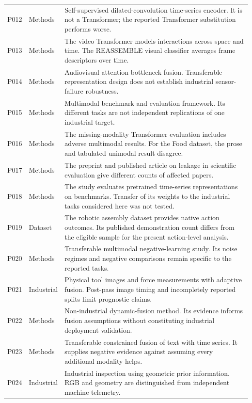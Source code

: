 \begin{longtable}{@{}P{.25\textwidth}P{.16\textwidth}P{.53\textwidth}@{}}
P012 \citep{P012} & Methods & Self-supervised dilated-convolution time-series encoder. It is not a Transformer; the reported Transformer substitution performs worse. \\
P013 \citep{P013} & Methods & The video Transformer models interactions across space and time. The REASSEMBLE visual classifier averages frame descriptors over time. \\
P014 \citep{Nagrani2021MBT} & Methods & Audiovisual attention-bottleneck fusion. Transferable representation design does not establish industrial sensor-failure robustness. \\
P015 \citep{P015} & Methods & Multimodal benchmark and evaluation framework. Its different tasks are not independent replications of one industrial target. \\
P016 \citep{P016} & Methods & The missing-modality Transformer evaluation includes adverse multimodal results. For the Food dataset, the prose and tabulated unimodal result disagree. \\
P017 \citep{P017} & Methods & The preprint and published article on leakage in scientific evaluation give different counts of affected papers. \\
P018 \citep{P018} & Methods & The study evaluates pretrained time-series representations on benchmarks. Transfer of its weights to the industrial tasks considered here was not tested. \\
P019 \citep{Sliwowski2025REASSEMBLE} & Dataset & The robotic assembly dataset provides native action outcomes. Its published demonstration count differs from the eligible sample for the present action-level analysis. \\
P020 \citep{P020} & Methods & Transferable multimodal negative-learning study. Its noise regimes and negative comparisons remain specific to the reported tasks. \\
P021 \citep{P021} & Industrial & Physical tool images and force measurements with adaptive fusion. Post-pass image timing and incompletely reported splits limit prognostic claims. \\
P022 \citep{P022} & Methods & Non-industrial dynamic-fusion method. Its evidence informs fusion assumptions without constituting industrial deployment validation. \\
P023 \citep{P023} & Methods & Transferable constrained fusion of text with time series. It supplies negative evidence against assuming every additional modality helps. \\
P024 \citep{P024} & Industrial & Industrial inspection using geometric prior information. RGB and geometry are distinguished from independent machine telemetry. \\

\end{longtable}
